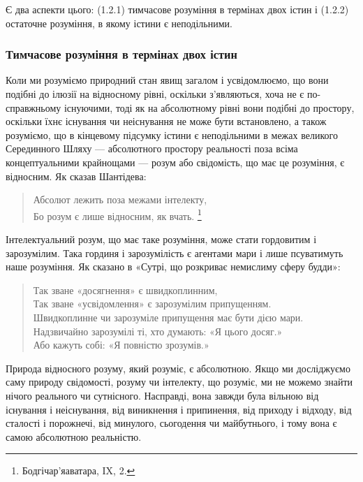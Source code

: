 \documentclass{article}
\begin{document}
Є два аспекти цього:
(1.2.1) тимчасове розуміння в термінах двох істин і
(1.2.2) остаточне розуміння, в якому істини є неподільними.

\subsubsection{Тимчасове розуміння в термінах двох істин}

Коли ми розуміємо природний стан явищ загалом і усвідомлюємо, що вони подібні до ілюзії на відносному рівні, оскільки з’являються, хоча не є по-справжньому існуючими, тоді як на абсолютному рівні вони подібні до простору, оскільки їхнє існування чи неіснування не може бути встановлено, а також розуміємо, що в кінцевому підсумку істини є неподільними в межах великого Серединного Шляху — абсолютного простору реальності поза всіма концептуальними крайнощами — розум або свідомість, що має це розуміння, є відносним. Як сказав Шантідева:

\begin{verse}
        Абсолют лежить поза межами інтелекту, \\
        Бо розум є лише відносним, як вчать. \footnote{Бодгічар’яаватара, IX, 2.}
\end{verse}

Інтелектуальний розум, що має таке розуміння, може стати гордовитим і зарозумілим. Така гординя і зарозумілість є агентами мари і лише псуватимуть наше розуміння. Як сказано в «Сутрі, що розкриває немислиму сферу будди»:

\begin{verse}
        Так зване «досягнення» є швидкоплинним, \\
        Так зване «усвідомлення» є зарозумілим припущенням. \\
        Швидкоплинне чи зарозуміле припущення має бути дією мари. \\
        Надзвичайно зарозумілі ті, хто думають: «Я цього досяг.» \\
        Або кажуть собі: «Я повністю зрозумів.»
\end{verse}

Природа відносного розуму, який розуміє, є абсолютною.
Якщо ми досліджуємо саму природу свідомості, розуму чи інтелекту,
що розуміє, ми не можемо знайти нічого реального чи сутнісного.
Насправді, вона завжди була вільною від існування і неіснування,
від виникнення і припинення, від приходу і відходу, від сталості
і порожнечі, від минулого, сьогодення чи майбутнього,
і тому вона є самою абсолютною реальністю.
\end{document}
